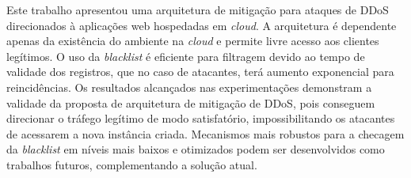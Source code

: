 
Este trabalho apresentou uma arquitetura de mitigação para ataques de DDoS direcionados à aplicações web hospedadas em \emph{cloud}. A arquitetura é dependente apenas da existência do ambiente na \emph{cloud} e permite livre acesso aos clientes legítimos. O uso da \emph{blacklist} é eficiente para filtragem devido ao tempo de validade dos registros, que no caso de atacantes, terá aumento exponencial para reincidências. 
%
Os resultados alcançados nas experimentações demonstram a validade da proposta de arquitetura de mitigação de DDoS, pois conseguem direcionar o tráfego legítimo de modo satisfatório, impossibilitando os atacantes de acessarem a nova instância criada. Mecanismos mais robustos para a checagem da \emph{blacklist} em níveis mais baixos e otimizados podem ser desenvolvidos como trabalhos futuros, complementando a solução atual.

